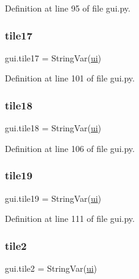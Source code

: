 Definition at line 95 of file gui.\+py.

\mbox{\label{namespacegui_aa98b8a15d8433c66120f88e562f8c2e8}} 
\subsubsection{\texorpdfstring{tile17}{tile17}}
{\footnotesize\ttfamily gui.\+tile17 = String\+Var(\mbox{\hyperlink{namespacegui_a40ab7281456eadbea2dc2038f5c24fa1}{ui}})}



Definition at line 101 of file gui.\+py.

\mbox{\label{namespacegui_aabbaa4aef16bc80ffc978a99aa5d49bc}} 
\subsubsection{\texorpdfstring{tile18}{tile18}}
{\footnotesize\ttfamily gui.\+tile18 = String\+Var(\mbox{\hyperlink{namespacegui_a40ab7281456eadbea2dc2038f5c24fa1}{ui}})}



Definition at line 106 of file gui.\+py.

\mbox{\label{namespacegui_a73e86c0a1db0de3424a7ca918dd92542}} 
\subsubsection{\texorpdfstring{tile19}{tile19}}
{\footnotesize\ttfamily gui.\+tile19 = String\+Var(\mbox{\hyperlink{namespacegui_a40ab7281456eadbea2dc2038f5c24fa1}{ui}})}



Definition at line 111 of file gui.\+py.

\mbox{\label{namespacegui_a53f57a204bf56c498146081b29ab8750}} 
\subsubsection{\texorpdfstring{tile2}{tile2}}
{\footnotesize\ttfamily gui.\+tile2 = String\+Var(\mbox{\hyperlink{namespacegui_a40ab7281456eadbea2dc2038f5c24fa1}{ui}})}



